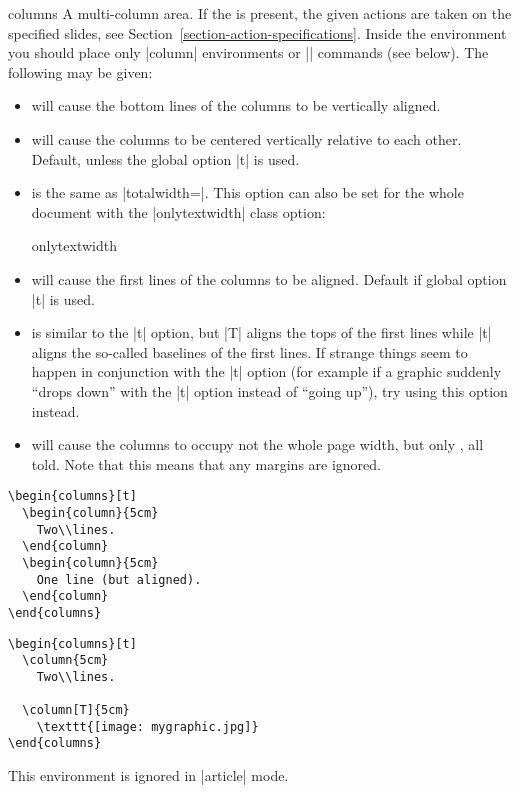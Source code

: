 \begin{environment}{{columns}}
  A multi-column area. If the  is present, the given actions are taken on the specified slides, see Section~\ref{section-action-specifications}. Inside the environment you should place only |column| environments or |\column| commands (see below). The following  may be given:
  \begin{itemize}
  \item
     will cause the bottom lines of the columns to be vertically aligned.
  \item
     will cause the columns to be centered vertically relative to each other. Default, unless the global option |t| is used.
  \item
     is the same as |totalwidth=\textwidth|. This option can also be set for the whole document with the |onlytextwidth| class option:
    \begin{classoption}{onlytextwidth}
    \end{classoption}
  \item
     will cause the first lines of the columns to be aligned. Default if global option |t| is used.
  \item
     is similar to the |t| option, but |T| aligns the tops of the first lines while |t| aligns the so-called baselines of the first lines. If strange things seem to happen in conjunction with the |t| option (for example if a graphic suddenly ``drops down'' with the |t| option instead of ``going up''), try using this option instead.
  \item
     will cause the columns to occupy not the whole page width, but only , all told.
     Note that this means that any margins are ignored.
  \end{itemize}

  \example
\begin{verbatim}
\begin{columns}[t]
  \begin{column}{5cm}
    Two\\lines.
  \end{column}
  \begin{column}{5cm}
    One line (but aligned).
  \end{column}
\end{columns}
\end{verbatim}

  \example
\begin{verbatim}
\begin{columns}[t]
  \column{5cm}
    Two\\lines.

  \column[T]{5cm}
    \texttt{[image: mygraphic.jpg]}
\end{columns}
\end{verbatim}

  \articlenote
  This environment is ignored in |article| mode.

\end{environment}

